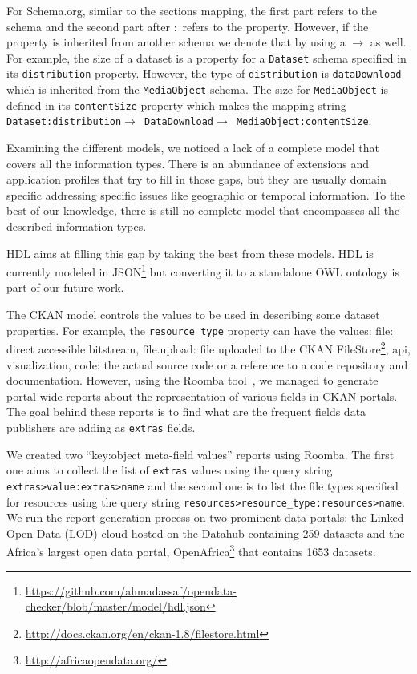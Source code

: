 For Schema.org, similar to the sections mapping, the first part refers to the schema and the second part after $:$ refers to the property. However, if the property is inherited from another schema we denote that by using a $\rightarrow$ as well. For example, the size of a dataset is a property for a \texttt{Dataset} schema specified in its \texttt{distribution} property. However, the type of \texttt{distribution} is \texttt{dataDownload} which is inherited from the \texttt{MediaObject} schema. The size for \texttt{MediaObject} is defined in its \texttt{contentSize} property which makes the mapping string \texttt{Dataset:distribution$\rightarrow$ DataDownload$\rightarrow$ MediaObject:contentSize}.

Examining the different models, we noticed a lack of a complete model that covers all the information types. There is an abundance of extensions and application profiles that try to fill in those gaps, but they are usually domain specific addressing specific issues like geographic or temporal information. To the best of our knowledge, there is still no complete model that encompasses all the described information types.

HDL aims at filling this gap by taking the best from these models. HDL is currently modeled in JSON\footnote{\url{https://github.com/ahmadassaf/opendata-checker/blob/master/model/hdl.json}} but converting it to a standalone OWL ontology is part of our future work.

The CKAN model controls the values to be used in describing some dataset properties. For example, the \texttt{resource\_type} property can have the values: file: direct accessible bitstream, file.upload: file uploaded to the CKAN FileStore\footnote{\url{http://docs.ckan.org/en/ckan-1.8/filestore.html}}, api, visualization, code: the actual source code or a reference to a code repository and documentation. However, using the Roomba tool~\cite{Assaf:WWW:15}, we managed to generate portal-wide reports about the representation of various fields in CKAN portals. The goal behind these reports is to find what are the frequent fields data publishers are adding as \texttt{extras} fields.

We created two ``key:object meta-field values'' reports using Roomba. The first one aims to collect the list of \texttt{extras} values using the query string\\ \texttt{extras>value:extras>name} and the second one is to list the file types specified for resources using the query string \texttt{resources>resource\_type:resources>name}. We run the report generation process on two prominent data portals: the Linked Open Data (LOD) cloud hosted on the Datahub containing 259 datasets and the Africa's largest open data portal, OpenAfrica\footnote{\url{http://africaopendata.org/}} that contains 1653 datasets.

